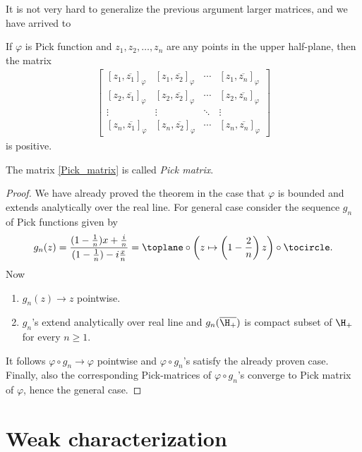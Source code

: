 It is not very hard to generalize the previous argument larger matrices, and we have arrived to
\begin{lause}\label{pick-nevanlinna_theorem}
	If $\varphi$ is Pick function and $z_{1}, z_{2}, \ldots, z_{n}$ are any points in the upper half-plane, then the matrix
	\begin{align}\label{Pick_matrix}
	\begin{bmatrix}
		[z_{1}, \overline{z_{1}}]_{\varphi} & [z_{1}, \overline{z_{2}}]_{\varphi} & \cdots & [z_{1}, \overline{z_{n}}]_{\varphi} \\
		[z_{2}, \overline{z_{1}}]_{\varphi} & [z_{2}, \overline{z_{2}}]_{\varphi} & \cdots & [z_{2}, \overline{z_{n}}]_{\varphi} \\
		\vdots & \vdots & \ddots & \vdots \\
		[z_{n}, \overline{z_{1}}]_{\varphi} & [z_{n}, \overline{z_{2}}]_{\varphi} & \cdots &  [z_{n}, \overline{z_{n}}]_{\varphi}
	\end{bmatrix}
	\end{align}
	is positive.
\end{lause}

The matrix \ref{Pick_matrix} is called \textit{Pick matrix}.

\begin{proof}
	We have already proved the theorem in the case that $\varphi$ is bounded and extends analytically over the real line. For general case consider the sequence $g_{n}$ of Pick functions given by
	\[
		g_{n}(z) = \frac{(1 - \frac{1}{n})x + \frac{i}{n}}{(1 - \frac{1}{n}) - i\frac{x}{n}} = \toplane \circ \left(z \mapsto \left(1 - \frac{2}{n}\right)z\right) \circ \tocircle.
	\]
	Now
	\begin{enumerate}
		\item $g_{n}(z) \to z$ pointwise.
		\item $g_{n}$'s extend analytically over real line and $g_{n}(\overline{\H_{+}})$ is compact subset of $\H_{+}$ for every $n \geq 1$.
	\end{enumerate}
	It follows $\varphi \circ g_{n} \to \varphi$ pointwise and $\varphi \circ g_{n}$'s satisfy the already proven case. Finally, also the corresponding Pick-matrices of $\varphi \circ g_{n}$'s converge to Pick matrix of $\varphi$, hence the general case.
\end{proof}

\section{Weak characterization}

